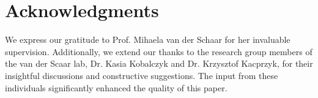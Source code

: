 \documentclass{article}
\begin{document}
\section*{Acknowledgments}
We express our gratitude to Prof. Mihaela van der Schaar for her invaluable supervision. 
Additionally, we extend our thanks to the research group members of the van der Scaar lab, Dr. Kasia Kobalczyk and Dr. Krzysztof Kacprzyk, for their insightful discussions and constructive suggestions. 
The input from these individuals significantly enhanced the quality of this paper.








\end{document}
